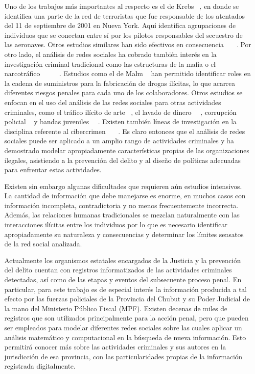 Uno de los trabajos más importantes al respecto es el de Krebs ~\cite{krebs2002mapping}, en donde se identifica una parte de la red de terroristas que fue responsable de los atentados del 11 de septiembre de 2001 en Nueva York. Aquí identifica agrupaciones de individuos que se conectan entre sí por los pilotos responsables del secuestro de las aeronaves. Otros estudios similares han sido efectivos en consecuencia ~\cite{medina2014social}~\cite{qin2005analyzing}~\cite{stollenwerk2016taking}.  Por otro lado, el análisis de redes sociales ha cobrado también interés en la investigación criminal tradicional como las estructuras de la mafia o el narcotráfico ~\cite{bouchard2013advances}~\cite{bright2015use}~\cite{giommoni2017illicit}~\cite{morselli2009hells}~\cite{morselli2010assessing}. Estudios como el de Malm ~\cite{malm2011networks} han permitido identificar roles en la cadena de suministros para la fabricación de drogas ilícitas, lo que acarrea diferentes riesgos penales para cada uno de los colaboradores. Otros estudios se enfocan en el uso del análisis de las redes sociales para otras actividades criminales, como el tráfico ilícito de arte ~\cite{bichler2013small}, el lavado de dinero ~\cite{colladon2017using}~\cite{soudijn2014using}, corrupción policial ~\cite{lauchs2011corrupt} y bandas juveniles ~\cite{mcgloin2005policy}~\cite{bichler2014magnetic}. Existen también líneas de investigación en la disciplina referente al cibercrimen ~\cite{decary2014information}~\cite{decary2012social}~\cite{decary2013reputation}. Es claro entonces que el análisis de redes sociales puede ser aplicado a un amplio rango de actividades criminales y ha demostrado modelar apropiadamente características propias de las organizaciones ilegales, asistiendo a la prevención del delito y al diseño de políticas adecuadas para enfrentar estas actividades.

Existen sin embargo algunas dificultades que requieren aún estudios intensivos. La cantidad de información que debe manejarse es enorme, en muchos casos con información incompleta, contradictoria y no menos frecuentemente incorrecta. Además, las relaciones humanas tradicionales se mezclan naturalmente con las interacciones ilícitas entre los individuos por lo que es necesario identificar apropiadamente su naturaleza y consecuencias y determinar los límites sensatos de la red social analizada. 

Actualmente los organismos estatales encargados de la Justicia y la prevención del delito cuentan con registros informatizados de las actividades criminales detectadas, así como de las etapas y eventos del subsecuente proceso penal. En particular, para este trabajo es de especial interés la información producida a tal efecto por las fuerzas policiales de la Provincia del Chubut y su Poder Judicial de la mano del Ministerio Público Fiscal (MPF). Existen decenas de miles de registros que son utilizados principalmente para la acción penal, pero que pueden ser empleados para modelar diferentes redes sociales sobre las cuales aplicar un análisis matemático y computacional en la búsqueda de nueva información. Esto permitirá conocer más sobre las actividades criminales y sus autores en la jurisdicción de esa provincia, con las particularidades propias de la información registrada digitalmente.

